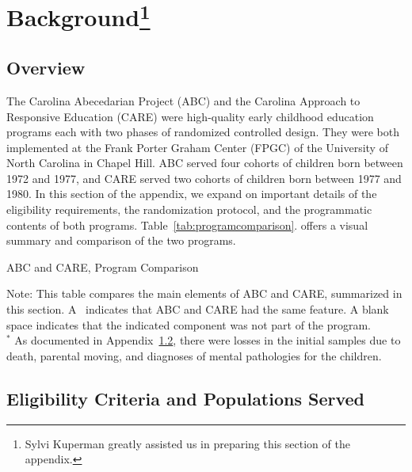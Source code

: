\section[Background]{Background\footnote{Sylvi Kuperman greatly assisted us in preparing this section of the appendix.}} \label{appendix:background}

\subsection{Overview}

\noindent The Carolina Abecedarian Project (ABC) and the Carolina Approach to Responsive Education (CARE) were high-quality early childhood education programs each with two phases of randomized controlled design. They were both implemented at the Frank Porter Graham Center (FPGC) of the University of North Carolina in Chapel Hill. ABC served four cohorts of children born between 1972 and 1977, and CARE served two cohorts of children born between 1977 and 1980. In this section of the appendix, we expand on important details of the eligibility requirements, the randomization protocol, and the programmatic contents of both programs. Table~\ref{tab:programcomparison}. offers a visual summary and comparison of the two programs.

\begin{table}[!htbp]
\centering
\caption{ABC and CARE, Program Comparison} \label{tab:programcomparison}
\begin{adjustbox}{max width=\textwidth}
\begin{threeparttable}
	\small
	
\begin{tablenotes}
\small
\item Note: This table compares the main elements of ABC and CARE, summarized in this section. A \checkmark\ indicates that ABC and CARE had the same feature. A blank space indicates that the indicated component was not part of the program.\\
    $^*$ As documented in Appendix~\ref{app:eligibility-pop}, there were losses in the initial samples due to death, parental moving, and diagnoses of mental pathologies for the children.
\end{tablenotes}
\end{threeparttable}
\end{adjustbox}
\end{table}


\subsection{Eligibility Criteria and Populations Served}\label{app:eligibility-pop}

